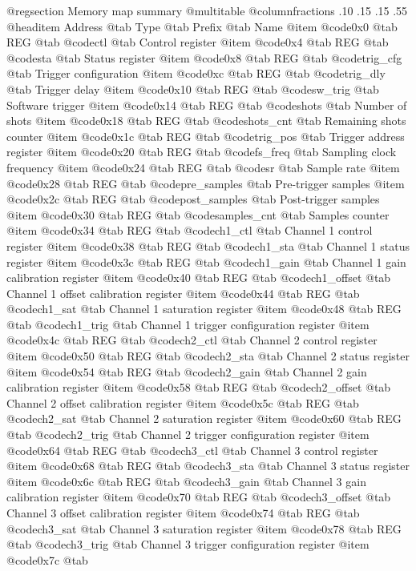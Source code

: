 @regsection Memory map summary
@multitable  @columnfractions .10 .15 .15 .55
@headitem Address @tab Type @tab Prefix @tab Name
@item @code{0x0} @tab
REG @tab
@code{ctl} @tab
Control register
@item @code{0x4} @tab
REG @tab
@code{sta} @tab
Status register
@item @code{0x8} @tab
REG @tab
@code{trig_cfg} @tab
Trigger configuration
@item @code{0xc} @tab
REG @tab
@code{trig_dly} @tab
Trigger delay
@item @code{0x10} @tab
REG @tab
@code{sw_trig} @tab
Software trigger
@item @code{0x14} @tab
REG @tab
@code{shots} @tab
Number of shots
@item @code{0x18} @tab
REG @tab
@code{shots_cnt} @tab
Remaining shots counter
@item @code{0x1c} @tab
REG @tab
@code{trig_pos} @tab
Trigger address register
@item @code{0x20} @tab
REG @tab
@code{fs_freq} @tab
Sampling clock frequency
@item @code{0x24} @tab
REG @tab
@code{sr} @tab
Sample rate
@item @code{0x28} @tab
REG @tab
@code{pre_samples} @tab
Pre-trigger samples
@item @code{0x2c} @tab
REG @tab
@code{post_samples} @tab
Post-trigger samples
@item @code{0x30} @tab
REG @tab
@code{samples_cnt} @tab
Samples counter
@item @code{0x34} @tab
REG @tab
@code{ch1_ctl} @tab
Channel 1 control register
@item @code{0x38} @tab
REG @tab
@code{ch1_sta} @tab
Channel 1 status register
@item @code{0x3c} @tab
REG @tab
@code{ch1_gain} @tab
Channel 1 gain calibration register
@item @code{0x40} @tab
REG @tab
@code{ch1_offset} @tab
Channel 1 offset calibration register
@item @code{0x44} @tab
REG @tab
@code{ch1_sat} @tab
Channel 1 saturation register
@item @code{0x48} @tab
REG @tab
@code{ch1_trig} @tab
Channel 1 trigger configuration register
@item @code{0x4c} @tab
REG @tab
@code{ch2_ctl} @tab
Channel 2 control register
@item @code{0x50} @tab
REG @tab
@code{ch2_sta} @tab
Channel 2 status register
@item @code{0x54} @tab
REG @tab
@code{ch2_gain} @tab
Channel 2 gain calibration register
@item @code{0x58} @tab
REG @tab
@code{ch2_offset} @tab
Channel 2 offset calibration register
@item @code{0x5c} @tab
REG @tab
@code{ch2_sat} @tab
Channel 2 saturation register
@item @code{0x60} @tab
REG @tab
@code{ch2_trig} @tab
Channel 2 trigger configuration register
@item @code{0x64} @tab
REG @tab
@code{ch3_ctl} @tab
Channel 3 control register
@item @code{0x68} @tab
REG @tab
@code{ch3_sta} @tab
Channel 3 status register
@item @code{0x6c} @tab
REG @tab
@code{ch3_gain} @tab
Channel 3 gain calibration register
@item @code{0x70} @tab
REG @tab
@code{ch3_offset} @tab
Channel 3 offset calibration register
@item @code{0x74} @tab
REG @tab
@code{ch3_sat} @tab
Channel 3 saturation register
@item @code{0x78} @tab
REG @tab
@code{ch3_trig} @tab
Channel 3 trigger configuration register
@item @code{0x7c} @tab
